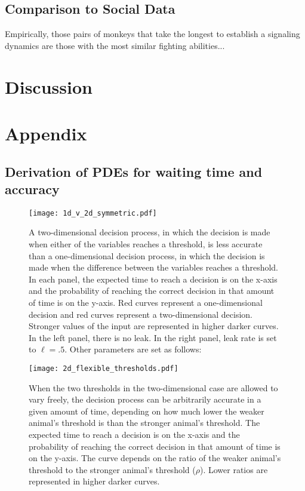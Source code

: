 \documentclass{article}
\begin{document}
\subsection{Comparison to Social Data }
Empirically, those pairs of monkeys that take the longest to establish a signaling dynamics are those with the most similar fighting abilities...

\section{Discussion}


\section{Appendix}

\subsection{Derivation of PDEs for waiting time and accuracy \label{pdes_deriv}}

\begin{figure}
\texttt{[image: 1d\_v\_2d\_symmetric.pdf]}
\caption{\label{1dv2d} A two-dimensional decision process, in which the decision is made when either of the variables reaches a threshold, is less accurate than a one-dimensional decision process, in which the decision is made when the difference between the variables reaches a threshold.  In each panel, the expected time to reach a decision is on the x-axis and the probability of reaching the correct decision in that amount of time is on the y-axis.  Red curves represent a one-dimensional decision and red curves represent a two-dimensional decision.  Stronger values of the input are represented in higher darker curves.  In the left panel, there is no leak.  In the right panel, leak rate is set to $\ell=.5$.  Other parameters are set as follows:}
\end{figure}

\begin{figure}
\texttt{[image: 2d\_flexible\_thresholds.pdf]}
\caption{\label{2dthresh} When the two thresholds in the two-dimensional case are allowed to vary freely, the decision process can be arbitrarily accurate in a given amount of time, depending on how much lower the weaker animal's threshold is than the stronger animal's threshold.  The expected time to reach a decision is on the x-axis and the probability of reaching the correct decision in that amount of time is on the y-axis.  The curve depends on the ratio of the weaker animal's threshold to the stronger animal's threshold ($\rho$).  Lower ratios are represented in higher darker curves.}
\end{figure}
\end{document}
